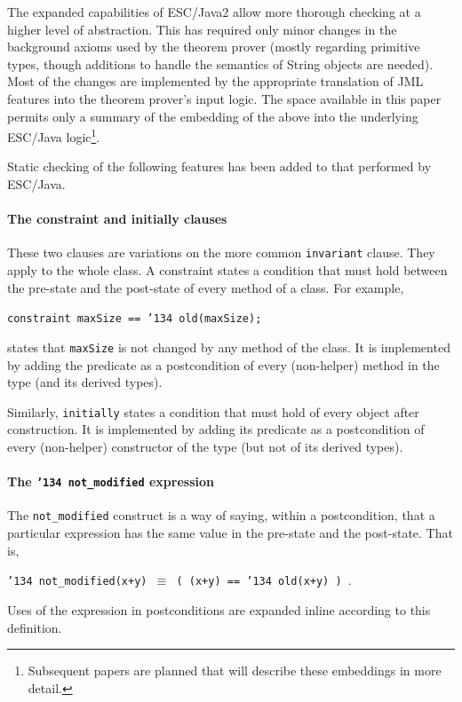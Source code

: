 \documentclass{llncs}
\begin{document}
The expanded capabilities of ESC/Java2 allow more thorough checking at
a higher level of abstraction.  This has required only minor changes
in the background axioms used by the theorem prover (mostly regarding
primitive types, though additions to handle the semantics of String
objects are needed).  Most of the changes are implemented by the
appropriate translation of JML features into the theorem prover's
input logic.  The space available in this paper permits only a summary
of the embedding of the above into the underlying ESC/Java
logic\footnote{Subsequent papers are planned that will describe these
  embeddings in more detail.}.

Static checking of the following features has been added to that
performed by ESC/Java.  


\paragraph*{The constraint and initially clauses}
These two clauses are variations on the more common \texttt{invariant}
clause.  They apply to the whole class.  A constraint states a
condition that must hold between the pre-state and the post-state of
every method of a class.  For example,
\begin{center}
\texttt{constraint maxSize == \char'134 old(maxSize); }
\end{center}
states that \texttt{maxSize} is not changed by any method of the
class.  It is implemented by adding the predicate as a postcondition
of every (non-helper) method in the type (and its derived types).

Similarly, \texttt{initially} states a condition that must hold of
every object after construction.  It is implemented by adding its
predicate as a postcondition of every (non-helper) constructor of the
type (but not of its derived types).

\paragraph*{The \texttt{\char'134 not\_modified} expression}
The \texttt{not\_modified} construct is a way of saying, within a
postcondition, that a particular expression has the same value in the
pre-state and the post-state.  That is,
\begin{center}
\texttt{\char'134 not\_modified(x+y) $\equiv$ ( (x+y) == \char'134 old(x+y) )  }.
\end{center}
Uses of the expression in postconditions are expanded inline according
to this definition.
\end{document}
